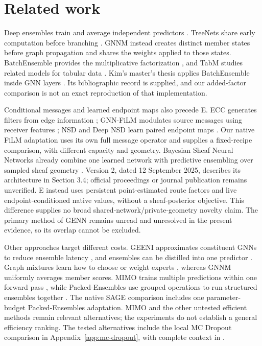 \documentclass{article}
\begin{document}
\section{Related work}
Deep ensembles train and average independent predictors \citep{lakshminarayanan2017simple}. TreeNets share early computation before branching \citep{lee2015heads}. GNNM instead creates distinct member states before graph propagation and shares the weights applied to those states. BatchEnsemble provides the multiplicative factorization \citep{wen2020batchensemble}, and TabM studies related models for tabular data \citep{gorishniy2025tabm}. Kim's master's thesis applies BatchEnsemble inside GNN layers \citep{kim2023efficient}. Its bibliographic record is supplied, and our added-factor comparison is not an exact reproduction of that implementation.

Conditional messages and learned endpoint maps also precede E. ECC generates filters from edge information \citep{simonovsky2017ecc}; GNN-FiLM modulates source messages using receiver features \citep{brockschmidt2020film}; NSD and Deep NSD learn paired endpoint maps \citep{bodnar2022sheaf,bourgerie2026deepnsd}. Our native FiLM adaptation uses its own full message operator and supplies a fixed-recipe comparison, with different capacity and geometry. Bayesian Sheaf Neural Networks already combine one learned network with predictive ensembling over sampled sheaf geometry \citep{gillespie2025bsnnv2}. Version 2, dated 12 September 2025, describes its architecture in Section 3.4; official proceedings or journal publication remains unverified. E instead uses persistent point-estimated route factors and live endpoint-conditioned native values, without a sheaf-posterior objective. This difference supplies no broad shared-network/private-geometry novelty claim. The primary method of GENN \citep{duan2024graph} remains unread and unresolved in the present evidence, so its overlap cannot be excluded.

Other approaches target different costs. GEENI approximates constituent GNNs to reduce ensemble latency \citep{nagarajan2022geeni}, and ensembles can be distilled into one predictor \citep{zhang2024e2gnn}. Graph mixtures learn how to choose or weight experts \citep{wang2023graph,deng2025mixture}, whereas GNNM uniformly averages member scores. MIMO trains multiple predictions within one forward pass \citep{havasi2021training}, while Packed-Ensembles use grouped operations to run structured ensembles together \citep{laurent2023packed}. The native SAGE comparison includes one parameter-budget Packed-Ensembles adaptation. MIMO and the other untested efficient methods remain relevant alternatives; the experiments do not establish a general efficiency ranking. The tested alternatives include the local MC Dropout comparison in Appendix~\ref{app:mc-dropout}, with complete context in .
\end{document}
